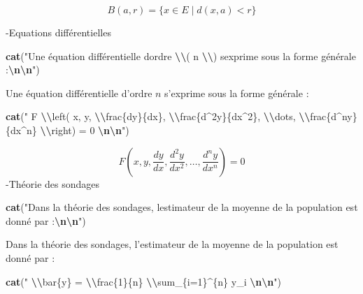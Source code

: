 \documentclass[
]{article}
\newenvironment{Shaded}{\begin{snugshade}}{\end{snugshade}}
\newcommand{\FunctionTok}[1]{\textcolor[rgb]{0.13,0.29,0.53}{\textbf{#1}}}
\newcommand{\NormalTok}[1]{#1}
\newcommand{\SpecialCharTok}[1]{\textcolor[rgb]{0.81,0.36,0.00}{\textbf{#1}}}
\newcommand{\StringTok}[1]{\textcolor[rgb]{0.31,0.60,0.02}{#1}}
\begin{document}
\[ B(a, r) = \{ x \in E \mid d(x, a) < r \} \]

-Equations différentielles

\begin{Shaded}
\begin{Highlighting}[]
\FunctionTok{cat}\NormalTok{(}\StringTok{"Une équation différentielle d\textquotesingle{}ordre }\SpecialCharTok{\textbackslash{}\textbackslash{}}\StringTok{( n }\SpecialCharTok{\textbackslash{}\textbackslash{}}\StringTok{) s\textquotesingle{}exprime sous la forme générale :}\SpecialCharTok{\textbackslash{}n\textbackslash{}n}\StringTok{"}\NormalTok{)}
\end{Highlighting}
\end{Shaded}

Une équation différentielle d'ordre \(n\) s'exprime sous la forme
générale :

\begin{Shaded}
\begin{Highlighting}[]
\FunctionTok{cat}\NormalTok{(}\StringTok{"$$ F }\SpecialCharTok{\textbackslash{}\textbackslash{}}\StringTok{left( x, y, }\SpecialCharTok{\textbackslash{}\textbackslash{}}\StringTok{frac\{dy\}\{dx\}, }\SpecialCharTok{\textbackslash{}\textbackslash{}}\StringTok{frac\{d\^{}2y\}\{dx\^{}2\}, }\SpecialCharTok{\textbackslash{}\textbackslash{}}\StringTok{dots, }\SpecialCharTok{\textbackslash{}\textbackslash{}}\StringTok{frac\{d\^{}ny\}\{dx\^{}n\} }\SpecialCharTok{\textbackslash{}\textbackslash{}}\StringTok{right) = 0 $$}\SpecialCharTok{\textbackslash{}n\textbackslash{}n}\StringTok{"}\NormalTok{)}
\end{Highlighting}
\end{Shaded}

\[ F \left( x, y, \frac{dy}{dx}, \frac{d^2y}{dx^2}, \dots, \frac{d^ny}{dx^n} \right) = 0 \]
-Théorie des sondages

\begin{Shaded}
\begin{Highlighting}[]
\FunctionTok{cat}\NormalTok{(}\StringTok{"Dans la théorie des sondages, l\textquotesingle{}estimateur de la moyenne de la population est donné par :}\SpecialCharTok{\textbackslash{}n\textbackslash{}n}\StringTok{"}\NormalTok{)}
\end{Highlighting}
\end{Shaded}

Dans la théorie des sondages, l'estimateur de la moyenne de la
population est donné par :

\begin{Shaded}
\begin{Highlighting}[]
\FunctionTok{cat}\NormalTok{(}\StringTok{"$$ }\SpecialCharTok{\textbackslash{}\textbackslash{}}\StringTok{bar\{y\} = }\SpecialCharTok{\textbackslash{}\textbackslash{}}\StringTok{frac\{1\}\{n\} }\SpecialCharTok{\textbackslash{}\textbackslash{}}\StringTok{sum\_\{i=1\}\^{}\{n\} y\_i $$}\SpecialCharTok{\textbackslash{}n\textbackslash{}n}\StringTok{"}\NormalTok{)}
\end{Highlighting}
\end{Shaded}
\end{document}
